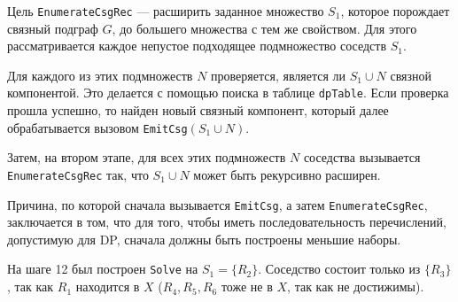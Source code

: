 \documentclass[12pt]{article}
\begin{document}
\begin{flushleft}
Цель \texttt{EnumerateCsgRec} — расширить заданное множество $S_1$,  
которое порождает связный подграф $G$, до большего множества с тем же свойством.  
Для этого рассматривается каждое непустое подходящее подмножество соседств $S_1$.  

Для каждого из этих подмножеств $N$ проверяется,  
является ли $S_1 \cup N$ связной компонентой.  
Это делается с помощью поиска в таблице \texttt{dpTable}.  
Если проверка прошла успешно, то найден новый связный компонент,  
который далее обрабатывается вызовом \texttt{EmitCsg}$(S_1 \cup N)$.  

Затем, на втором этапе, для всех этих подмножеств $N$ соседства 
вызывается \texttt{EnumerateCsgRec} так,  
что $S_1 \cup N$ может быть рекурсивно расширен.  

Причина, по которой сначала вызывается \texttt{EmitCsg},  
а затем \texttt{EnumerateCsgRec}, заключается в том,  
что для того, чтобы иметь последовательность перечислений,  
допустимую для DP,  
сначала должны быть построены меньшие наборы.  

\begin{center}
\end{center}

На шаге 12 был построен \texttt{Solve} на $S_1 = \{R_2\}$.  
Соседство состоит только из $\{R_3\}$, так как $R_1$ находится в $X$  
($R_4, R_5, R_6$ тоже не в $X$, так как не достижимы).  


\end{flushleft}
\end{document}
